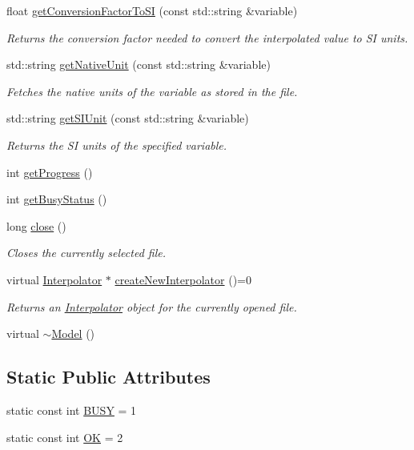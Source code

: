 \begin{DoxyCompactItemize}
float \hyperlink{classccmc_1_1_model_a360b4e5af01c3e06e6673bcbd3a45866}{get\-Conversion\-Factor\-To\-S\-I} (const std\-::string \&variable)
\begin{DoxyCompactList}\small\item\em Returns the conversion factor needed to convert the interpolated value to S\-I units. \end{DoxyCompactList}\item 
std\-::string \hyperlink{classccmc_1_1_model_adca33e777f077a8b8e8ad0a55b6522a2}{get\-Native\-Unit} (const std\-::string \&variable)
\begin{DoxyCompactList}\small\item\em Fetches the native units of the variable as stored in the file. \end{DoxyCompactList}\item 
std\-::string \hyperlink{classccmc_1_1_model_ad854953817fe933b40bc101ffd585270}{get\-S\-I\-Unit} (const std\-::string \&variable)
\begin{DoxyCompactList}\small\item\em Returns the S\-I units of the specified variable. \end{DoxyCompactList}\item 
int \hyperlink{classccmc_1_1_model_acefd918ab6e100f78db9321e0e9d52d1}{get\-Progress} ()
\item 
int \hyperlink{classccmc_1_1_model_a6447808cc040178db855bede2fbd1e57}{get\-Busy\-Status} ()
\item 
long \hyperlink{classccmc_1_1_model_ac6084cbe35b46be75d8421fd5ca91f23}{close} ()
\begin{DoxyCompactList}\small\item\em Closes the currently selected file. \end{DoxyCompactList}\item 
virtual \hyperlink{classccmc_1_1_interpolator}{Interpolator} $\ast$ \hyperlink{classccmc_1_1_model_a0dd491507c14502c27aa61b020fca8cc}{create\-New\-Interpolator} ()=0
\begin{DoxyCompactList}\small\item\em Returns an \hyperlink{classccmc_1_1_interpolator}{Interpolator} object for the currently opened file. \end{DoxyCompactList}\item 
virtual \hyperlink{classccmc_1_1_model_a477195ac6dd41b02c4f9714d41d83d48}{$\sim$\-Model} ()
\end{DoxyCompactItemize}
\subsection*{Static Public Attributes}
\begin{DoxyCompactItemize}
\item 
static const int \hyperlink{classccmc_1_1_model_a2455ad851ac80f63d5d0af2c6c77cfcc}{B\-U\-S\-Y} = 1
\item 
static const int \hyperlink{classccmc_1_1_model_a0a921cfb116d7b5e8e7b49b42c151f18}{O\-K} = 2
\end{DoxyCompactItemize}
